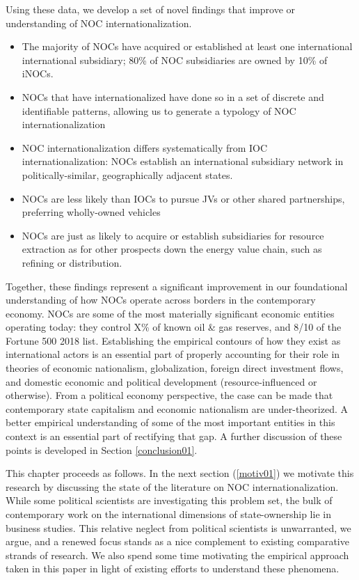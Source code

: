 \documentclass[11pt,]{book}
\providecommand{\tightlist}{%
  \setlength{\itemsep}{0pt}\setlength{\parskip}{0pt}}
\begin{document}
Using these data, we develop a set of novel findings that improve or understanding of NOC internationalization.

\begin{itemize}
\tightlist
\item
  The majority of NOCs have acquired or established at least one international international subsidiary; 80\% of NOC subsidiaries are owned by 10\% of iNOCs.
\item
  NOCs that have internationalized have done so in a set of discrete and identifiable patterns, allowing us to generate a typology of NOC internationalization
\item
  NOC internationalization differs systematically from IOC internationalization: NOCs establish an international subsidiary network in politically-similar, geographically adjacent states.
\item
  NOCs are less likely than IOCs to pursue JVs or other shared partnerships, preferring wholly-owned vehicles
\item
  NOCs are just as likely to acquire or establish subsidiaries for resource extraction as for other prospects down the energy value chain, such as refining or distribution.
\end{itemize}

Together, these findings represent a significant improvement in our foundational understanding of how NOCs operate across borders in the contemporary economy. NOCs are some of the most materially significant economic entities operating today: they control X\% of known oil \& gas reserves, and 8/10 of the Fortune 500 2018 list. Establishing the empirical contours of how they exist as international actors is an essential part of properly accounting for their role in theories of economic nationalism, globalization, foreign direct investment flows, and domestic economic and political development (resource-influenced or otherwise). From a political economy perspective, the case can be made that contemporary state capitalism and economic nationalism are under-theorized. A better empirical understanding of some of the most important entities in this context is an essential part of rectifying that gap. A further discussion of these points is developed in Section \ref{conclusion01}.

This chapter proceeds as follows. In the next section (\ref{motiv01}) we motivate this research by discussing the state of the literature on NOC internationalization. While some political scientists are investigating this problem set, the bulk of contemporary work on the international dimensions of state-ownership lie in business studies. This relative neglect from political scientists is unwarranted, we argue, and a renewed focus stands as a nice complement to existing comparative strands of research. We also spend some time motivating the empirical approach taken in this paper in light of existing efforts to understand these phenomena.
\end{document}
